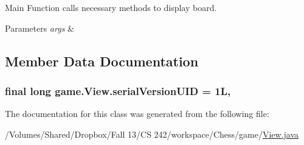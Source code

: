 Main Function calls necessary methods to display board. 
\begin{DoxyParams}{Parameters}
{\em args} & \\
\hline
\end{DoxyParams}


\subsection{Member Data Documentation}
\hypertarget{classgame_1_1_view_acce802e821f57f85f45a307314f81b50}{
\subsubsection[{serial\-Version\-U\-I\-D}]{\setlength{\rightskip}{0pt plus 5cm}final long game.\-View.\-serial\-Version\-U\-I\-D = 1\-L\hspace{0.3cm}{\ttfamily [static]}, {\ttfamily [private]}}}\label{classgame_1_1_view_acce802e821f57f85f45a307314f81b50}


The documentation for this class was generated from the following file\-:\begin{DoxyCompactItemize}
\item 
/\-Volumes/\-Shared/\-Dropbox/\-Fall 13/\-C\-S 242/workspace/\-Chess/game/\hyperlink{_view_8java}{View.\-java}\end{DoxyCompactItemize}
